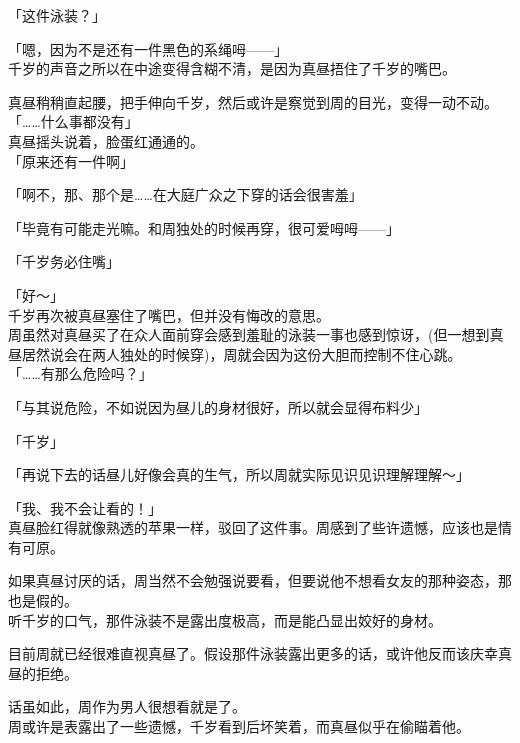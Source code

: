 「这件泳装？」

「嗯，因为不是还有一件黑色的系绳呣——」\\

千岁的声音之所以在中途变得含糊不清，是因为真昼捂住了千岁的嘴巴。

真昼稍稍直起腰，把手伸向千岁，然后或许是察觉到周的目光，变得一动不动。\\

「……什么事都没有」\\

真昼摇头说着，脸蛋红通通的。\\

「原来还有一件啊」

「啊不，那、那个是……在大庭广众之下穿的话会很害羞」

「毕竟有可能走光嘛。和周独处的时候再穿，很可爱呣呣——」

「千岁务必住嘴」

「好～」\\

千岁再次被真昼塞住了嘴巴，但并没有悔改的意思。\\

周虽然对真昼买了在众人面前穿会感到羞耻的泳装一事也感到惊讶，(但一想到真昼居然说会在两人独处的时候穿)，周就会因为这份大胆而控制不住心跳。\\%

「……有那么危险吗？」

「与其说危险，不如说因为昼儿的身材很好，所以就会显得布料少」

「千岁」

「再说下去的话昼儿好像会真的生气，所以周就实际见识见识理解理解～」

「我、我不会让看的！」\\

真昼脸红得就像熟透的苹果一样，驳回了这件事。周感到了些许遗憾，应该也是情有可原。

如果真昼讨厌的话，周当然不会勉强说要看，但要说他不想看女友的那种姿态，那也是假的。\\

听千岁的口气，那件泳装不是露出度极高，而是能凸显出姣好的身材。

目前周就已经很难直视真昼了。假设那件泳装露出更多的话，或许他反而该庆幸真昼的拒绝。

话虽如此，周作为男人很想看就是了。\\

周或许是表露出了一些遗憾，千岁看到后坏笑着，而真昼似乎在偷瞄着他。\\

